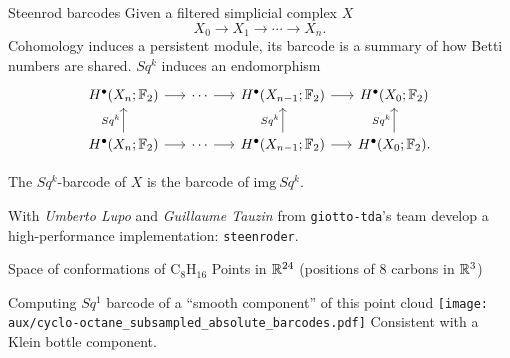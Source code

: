 \begin{frame}[fragile]{Steenrod barcodes}
	Given a filtered simplicial complex $X$
	\[
	X_0 \to X_1 \to \cdots \to X_n.
	\]
	Cohomology induces a \textcolor{pblue}{persistent module}, its \textcolor{pblue}{barcode} is a summary of how Betti numbers are shared.
	$Sq^k$ induces an endomorphism
	\[
	\begin{tikzcd}[column sep = 15]
	H^\bullet(X_n; \Ftwo) \arrow[r] & \cdots \arrow[r] & H^\bullet(X_{n-1}; \Ftwo) \arrow[r] & H^\bullet(X_0; \Ftwo) \\
	H^\bullet(X_n; \Ftwo) \arrow[u, "Sq^k"] \arrow[r] & \cdots \arrow[r] & H^\bullet(X_{n-1}; \Ftwo) \arrow[u, "Sq^k"] \arrow[r] & H^\bullet(X_0; \Ftwo) \arrow[u, "Sq^k"].
	\end{tikzcd}
	\]

	\pause
	The \textcolor{pblue}{$Sq^k$-barcode} of $X$ is the barcode of $\mathrm{img}\ Sq^k$.

	\bigskip\pause
	With \textit{Umberto Lupo} and \textit{Guillaume Tauzin} from \textcolor{pblue}{\texttt{giotto-tda}}'s team
	\medskip
	develop a high-performance implementation: \textcolor{pblue}{\texttt{steenroder}}.
\end{frame}

%

\begin{frame}{Space of conformations of $\mathrm{C_8H_{16}}$}
	Points in $\mathbb{R}^{24}$ (positions of $8$ carbons in $\mathbb{R}^3$)

	\pause\smallskip
	Computing $Sq^1$ barcode of a ``smooth component'' of this point cloud
	\smallskip
	\texttt{[image: aux/cyclo-octane\_subsampled\_absolute\_barcodes.pdf]}
	Consistent with a \textcolor{pblue}{Klein bottle} component.
\end{frame}

